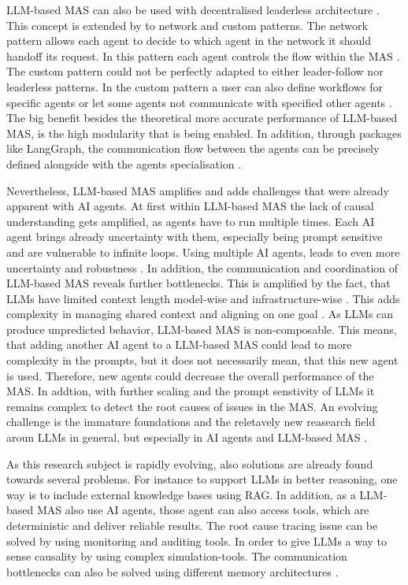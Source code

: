 \documentclass[a4paper,oneside,bibliography=totoc]{scrbook}
\begin{document}
\ac{LLM}-based \ac{MAS} can also be used with decentralised leaderless architecture \cite{OpenAI2025,LangChain2025b}. This concept is extended by \citet{LangChain2025b} to network and custom patterns. The network pattern allows each agent to decide to which agent in the network it should handoff its request. In this pattern each agent controls the flow within the \ac{MAS} \cite{LangChain2025b,OpenAI2025}. The custom pattern could not be perfectly adapted to either leader-follow nor leaderless patterns. In the custom pattern a user can also define workflows for specific agents or let some agents not communicate with specified other agents \cite{LangChain2025b}. The big benefit besides the theoretical more accurate performance of \ac{LLM}-based \ac{MAS}, is the high modularity that is being enabled. In addition, through packages like LangGraph, the communication flow between the agents can be precisely defined alongside with the agents specialisation \cite{LangChain2025b}.

Nevertheless, \ac{LLM}-based \ac{MAS} amplifies and adds challenges that were already apparent with \ac{AI} agents. At first within \ac{LLM}-based \ac{MAS} the lack of causal understanding gets amplified, as agents have to run multiple times. Each \ac{AI} agent brings already uncertainty with them, especially being prompt sensitive and are vulnerable to infinite loops. Using multiple \ac{AI} agents, leads to even more uncertainty and robustness \cite{Sapkota2025}. In addition, the communication and coordination of \ac{LLM}-based \ac{MAS} reveals further bottlenecks. This is amplified by the fact, that \acp{LLM} have limited context length model-wise and infrastructure-wise \cite{Kwon2023}. This adds complexity in managing shared context and aligning on one goal \cite{Sapkota2025,Han2025}. As \acp{LLM} can produce unpredicted behavior, \ac{LLM}-based \ac{MAS} is non-composable. This means, that adding another \ac{AI} agent to a \ac{LLM}-based \ac{MAS} could lead to more complexity in the prompts, but it does not necessarily mean, that this new agent is used. Therefore, new agents could decrease the overall performance of the \ac{MAS}. In addtion, with further scaling and the prompt senstivity of \acp{LLM} it remains complex to detect the root causes of issues in the \ac{MAS}. An evolving challenge is the immature foundations and the reletavely new reasearch field aroun \acp{LLM} in general, but especially in \ac{AI} agents and \ac{LLM}-based \ac{MAS} \cite{Sapkota2025}.

As this research subject is rapidly evolving, also solutions are already found towards several problems. For instance to support \acp{LLM} in better reasoning, one way is to include external knowledge bases using \ac{RAG}. In addition, as a \ac{LLM}-based \ac{MAS} also use \ac{AI} agents, those agent can also access tools, which are deterministic and deliver reliable results. The root cause tracing issue can be solved by using monitoring and auditing tools. In order to give \acp{LLM} a way to sense causality by using complex simulation-tools. The communication bottlenecks can also be solved using different memory architectures \cite{Sapkota2025}.
\end{document}
